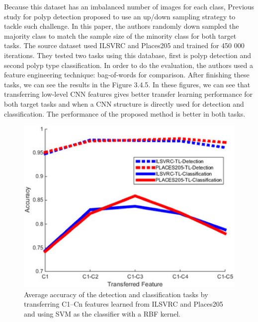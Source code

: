 \documentclass[10pt,twocolumn,letterpaper]{article}
\begin{document}
Because this dataset has an imbalanced number of images for each class, Previous study for polyp detection proposed to use an up/down sampling strategy to tackle such challenge. In this paper, the authors randomly down sampled the majority class to match the sample size of the minority class for both target tasks. The source dataset used ILSVRC and Places205 and trained for 450 000 iterations. They tested two tasks using this database, first is polyp detection and second polyp type classification. In order to do the evaluation, the authors used a feature engineering technique: bag-of-words for comparison. After finishing these tasks, we can see the results in the Figure 3.4.5. In these figures, we can see that transferring low-level CNN features gives better transfer learning performance for both target tasks and when a CNN structure is directly
used for detection and classification. The performance of the proposed method is better in both tasks.

\begin{figure}[t]
	\begin{center}
		\includegraphics[width=0.8\linewidth]{Pic/6.jpg}
	\end{center}
	\caption{Average accuracy of the detection and classification tasks by transferring C1–Cn features learned from ILSVRC and Places205 and using SVM as the classifier with a RBF kernel.}
	\label{fig:long}
	\label{fig:onecol}
\end{figure}
\end{document}
